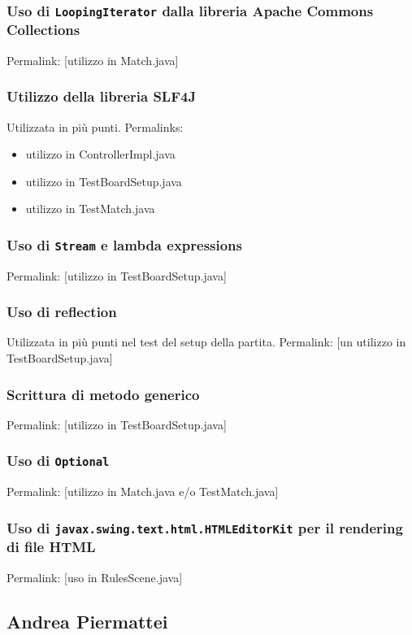 \documentclass[a4paper,12pt]{report}
\begin{document}
\subsubsection{Uso di \texttt{LoopingIterator} dalla libreria Apache Commons Collections}
Permalink: [utilizzo in Match.java]

\subsubsection{Utilizzo della libreria SLF4J}
Utilizzata in più punti. Permalinks:
\begin{itemize}
	\item utilizzo in ControllerImpl.java
	\item utilizzo in TestBoardSetup.java
	\item utilizzo in TestMatch.java
\end{itemize}

\subsubsection{Uso di \texttt{Stream} e lambda expressions}
Permalink: [utilizzo in TestBoardSetup.java]

\subsubsection{Uso di reflection}
Utilizzata in più punti nel test del setup della partita.
Permalink: [un utilizzo in TestBoardSetup.java]

\subsubsection{Scrittura di metodo generico}
Permalink: [utilizzo in TestBoardSetup.java]

\subsubsection{Uso di \texttt{Optional}}
Permalink: [utilizzo in Match.java e/o TestMatch.java]

\subsubsection{Uso di \texttt{javax.swing.text.html.HTMLEditorKit} per il rendering di file HTML}
Permalink: [uso in RulesScene.java]

\subsection{Andrea Piermattei}
\end{document}
